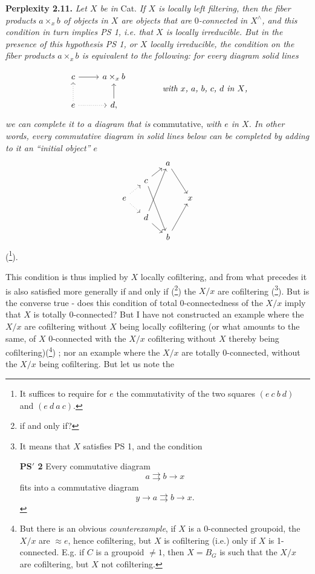 \documentclass[11pt]{article}
\newcommand{\printedpage}[1]{\marginpar{\footnotesize p.~#1}}
\newcommand{\msp}[1]{\marginpar{\footnotesize [#1]}}
\begin{document}
\textbf{Perplexity 2.11.} \textit{Let $X$ be in} Cat. \textit{If $X$ is locally left filtering, then the fiber products $a\times_x b$ of objects in $X$ are objects that are} $0$\textit{-connected in $X^\wedge$, and this condition in turn implies PS 1, i.e. that $X$ is locally irreducible. But in the presence of this hypothesis PS 1, or $X$ locally irreducible, the condition on the fiber products $a\times_x b$ is equivalent to the following: for every diagram} \textit{solid lines}

\msp{page 28}
\[
\begin{tikzcd}
c \arrow[r] & a\times_x b \\
e \arrow[u, dotted] \arrow[r, dotted] & d, \arrow[u]
\end{tikzcd}
\qquad\qquad
\textit{with $x$, $a$, $b$, $c$, $d$ in $X$,}
\]
\textit{we can complete it to a diagram that is} commutative, \textit{with $e$ in $X$. In other words, every commutative diagram in solid lines below can be completed by adding to it an ``initial object'' $e$} %
\[
\begin{tikzcd}[column sep=small, row sep=small]
 & & a \arrow[ddr] & \\
 & c \arrow[ur] \arrow[dddr] & & \\
e \arrow[ur, dotted] \arrow[dr, dotted] & & & x \\
 & d \arrow[uuur] \arrow[dr] & & \\
 & & b \arrow[uur] &
\end{tikzcd}
\]
(\footnote[33]{It suffices to require for $e$ the commutativity of the two squares $(e\ c\ b\ d)$ and $(e\ d\ a\ c)$.}).

This condition is thus implied by $X$ locally cofiltering, and from what precedes it is also satisfied more generally if and only if (\footnote[34]{if and only if?}) the $X/x$ are cofiltering (\footnote[35]{It means that $X$ satisfies PS 1, and the condition

\textbf{PS$'$ 2} Every commutative diagram
\[
a\rightrightarrows b\longrightarrow x
\]
fits into a commutative diagram
\[
y\longrightarrow a\rightrightarrows b\longrightarrow x.
\]
}). But is the converse true - does this condition of total 0-connectedness of the $X/x$ imply that $X$ is totally 0-connected? But I have not constructed an example where the $X/x$
\printedpage{18}
are cofiltering without $X$ being locally cofiltering (or what amounts to the same, of $X$ 0-connected with the $X/x$ cofiltering without $X$ thereby being cofiltering)(\footnote[36]{But there is an obvious \textit{counterexample}, if $X$ is a 0-connected groupoid, the $X/x$ are $\approx e$, hence cofiltering, but $X$ is cofiltering (i.e.) only if $X$ is 1-connected. E.g. if $C$ is a groupoid $\neq 1$, then $X=B_G$ is such that the $X/x$ are cofiltering, but $X$ not cofiltering. %
}) ; nor an example where the $X/x$ are totally 0-connected, without the $X/x$ being cofiltering. But let us note the
\end{document}
